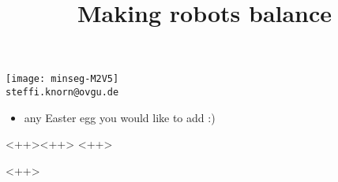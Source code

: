 \title	[Balancing Robots]	{Making robots balance}
\begin{frame}
	\titlepage
	\vspace{-2.5cm} 
	\begin{center}
	 	\texttt{[image: minseg-M2V5]} \\
		\texttt{steffi.knorn@ovgu.de}
	\end{center}
\end{frame}


\begin{frame}
	\begin{itemize}
		\item any Easter egg you would like to add :)
	\end{itemize}
\end{frame}





\begin{frame}{<++>}{<++>}
	<++>
	\note<1-1>{\begin{itemize}
		\item <++>
	\end{itemize}}
\end{frame}
<++>


